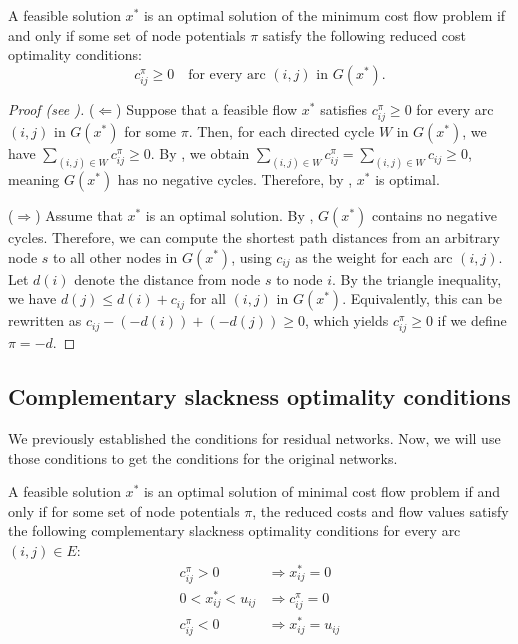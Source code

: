 \begin{theorem}
\label{red_cost_opt_cond}
A feasible solution $x^*$ is an optimal solution of the minimum cost flow problem if and only if some set of node potentials $\pi$ satisfy the following reduced cost optimality conditions:
\[
c_{ij}^\pi \geq 0 \quad \text{for every arc } (i,j) \text{ in } G(x^*).
\]
\end{theorem}

\begin{proof}[Proof (see {\cite[p.309]{ahuja1993network}})]

($\Leftarrow$)
Suppose that a feasible flow $x^*$ satisfies $c_{ij}^\pi \geq 0$ for every arc $(i,j)$ in $G(x^*)$ for some $\pi$. Then, for each directed cycle $W$ in $G(x^*)$, we have $\sum_{(i,j)\in W} c_{ij}^\pi \geq 0$. By , we obtain $\sum_{(i,j)\in W} c_{ij}^\pi = \sum_{(i,j)\in W} c_{ij} \geq 0$, meaning $G(x^*)$ has no negative cycles. Therefore, by , $x^*$ is optimal.

($\Rightarrow$) 
Assume that $x^*$ is an optimal solution. By , $G(x^*)$ contains no negative cycles. Therefore, we can compute the shortest path distances from an arbitrary node $s$ to all other nodes in $G(x^*)$, using $c_{ij}$ as the weight for each arc $(i,j)$. Let $d(i)$ denote the distance from node $s$ to node $i$. By the triangle inequality, we have $d(j) \leq d(i) + c_{ij}$ for all $(i,j)$ in $G(x^*)$. Equivalently, this can be rewritten as $c_{ij} - (-d(i)) + (-d(j)) \geq 0$, which yields $c_{ij}^\pi \geq 0$ if we define $\pi = -d$.
\end{proof}

\subsection{Complementary slackness optimality conditions}
We previously established the conditions for residual networks. Now, we will use those conditions to get the conditions for the original networks.

\begin{theorem}
\label{comp_slack}
    A feasible solution $x^*$ is an optimal solution of minimal cost flow problem if and only if for some set of node potentials $\pi$, the reduced costs and flow values satisfy the following complementary slackness optimality conditions for every arc $(i,j) \in E$:
\begin{align*}
    c_{ij}^\pi > 0 &\Rightarrow x_{ij}^* = 0 \\
    0 < x_{ij}^* < u_{ij} &\Rightarrow c_{ij}^\pi = 0 \\
    c_{ij}^\pi < 0 &\Rightarrow x_{ij}^* = u_{ij}
\end{align*}
\end{theorem}


